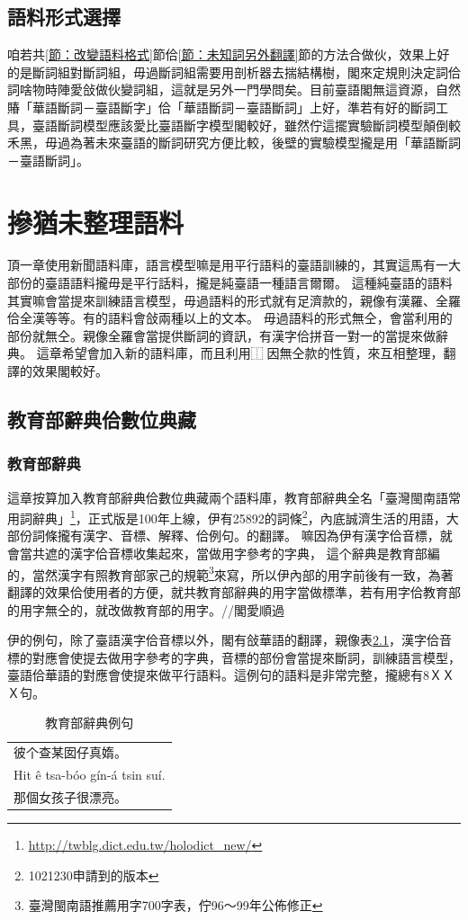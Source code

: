 \documentclass[final,oneside,onecolumn,12pt,a4paper]{book}%
\begin{document}
\section{語料形式選擇}
\label{節：語料形式選擇}
咱若共\ref{節：改變語料格式}節佮\ref{節：未知詞另外翻譯}節的方法合做伙，效果上好的是斷詞組對斷詞組，毋過斷詞組需要用剖析器去揣結構樹，閣來定規則決定詞佮詞啥物時陣愛敆做伙變詞組，這就是另外一門學問矣。目前臺語閣無這資源，自然賰「華語斷詞－臺語斷字」佮「華語斷詞－臺語斷詞」上好，準若有好的斷詞工具，臺語斷詞模型應該愛比臺語斷字模型閣較好，雖然佇這擺實驗斷詞模型顛倒較禾黑，毋過為著未來臺語的斷詞研究方便比較，後壁的實驗模型攏是用「華語斷詞－臺語斷詞」。

\chapter{摻猶未整理語料}
\label{章：摻猶未整理語料}
頂一章使用新聞語料庫，語言模型嘛是用平行語料的臺語訓練的，其實這馬有一大部份的臺語語料攏毋是平行話料，攏是純臺語一種語言爾爾。
這種純臺語的語料其實嘛會當提來訓練語言模型，毋過語料的形式就有足濟款的，親像有漢羅、全羅佮全漢等等。有的語料會敆兩種以上的文本。
毋過語料的形式無仝，會當利用的部份就無仝。親像全羅會當提供斷詞的資訊，有漢字佮拼音一對一的當提來做辭典。
這章希望會加入新的語料庫，而且利用⿰因無仝款的性質，來互相整理，翻譯的效果閣較好。


\section{教育部辭典佮數位典藏}
\label{節：教育部語料佮數位典藏}
\subsection{教育部辭典}
\label{節：教育部辭典}
這章按算加入教育部辭典佮數位典藏兩个語料庫，教育部辭典全名「臺灣閩南語常用詞辭典」\footnote{\url{http://twblg.dict.edu.tw/holodict_new/}}，正式版是100年上線，伊有25892的詞條\footnote{1021230申請到的版本}，內底誠濟生活的用語，大部份詞條攏有漢字、音標、解釋、佮例句。的翻譯。
嘛因為伊有漢字佮音標，就會當共遮的漢字佮音標收集起來，當做用字參考的字典，
這个辭典是教育部編的，當然漢字有照教育部家己的規範\footnote{臺灣閩南語推薦用字700字表，佇96～99年公佈修正}來寫，所以伊內部的用字前後有一致，為著翻譯的效果佮使用者的方便，就共教育部辭典的用字當做標準，若有用字佮教育部的用字無仝的，就改做教育部的用字。//閣愛順過

伊的例句，除了臺語漢字佮音標以外，閣有敆華語的翻譯，親像表\ref{表：教育部辭典例句}，漢字佮音標的對應會使提去做用字參考的字典，音標的部份會當提來斷詞，訓練語言模型，臺語佮華語的對應會使提來做平行語料。這例句的語料是非常完整，攏總有8ＸＸＸ句。
\begin{table}
\caption{教育部辭典例句}
\label{表：教育部辭典例句}
\centering
\begin{tabular}{l}
彼个查某囡仔真媠。 \\
Hit ê tsa-bóo gín-á tsin suí.\\
那個女孩子很漂亮。\\
\end{tabular}
\end{table}
\end{document}
